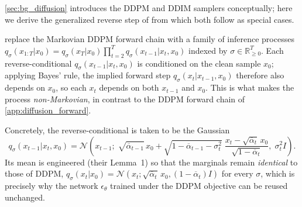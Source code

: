 \autoref{sec:bg_diffusion} introduces the DDPM and DDIM samplers conceptually; here we derive the generalized reverse step of \textcite{song_denoising_2022} from which both follow as special cases.

\textcite{song_denoising_2022} replace the Markovian DDPM forward chain with a family of inference processes $q_\sigma(x_{1:T}|x_0) = q_\sigma(x_T|x_0)\prod_{t=2}^{T} q_\sigma(x_{t-1}|x_t, x_0)$ indexed by $\sigma \in \mathbb{R}^T_{\ge 0}$. Each reverse-conditional $q_\sigma(x_{t-1}|x_t, x_0)$ is conditioned on the clean sample $x_0$; applying Bayes' rule, the implied forward step $q_\sigma(x_t|x_{t-1}, x_0)$ therefore also depends on $x_0$, so each $x_t$ depends on both $x_{t-1}$ and $x_0$. This is what makes the process \emph{non-Markovian}, in contrast to the DDPM forward chain of \autoref{app:diffusion_forward}.

Concretely, the reverse-conditional is taken to be the Gaussian
\begin{equation}
\label{eq:app_reverse_conditional}
    q_\sigma(x_{t-1}|x_t, x_0) = \mathcal{N}\!\left( x_{t-1};\; \sqrt{\overline{\alpha}_{t-1}}\,x_0 + \sqrt{1-\overline{\alpha}_{t-1}-\sigma_t^2}\;\frac{x_t - \sqrt{\overline{\alpha}_t}\,x_0}{\sqrt{1-\overline{\alpha}_t}},\; \sigma_t^2 I \right).
\end{equation}
Its mean is engineered (their Lemma~1) so that the marginals remain \emph{identical} to those of \acs{DDPM}, $q_\sigma(x_t|x_0) = \mathcal{N}(x_t; \sqrt{\overline{\alpha}_t}\,x_0, (1-\overline{\alpha}_t) I)$ for every $\sigma$, which is precisely why the network $\epsilon_\theta$ trained under the \acs{DDPM} objective can be reused unchanged.

